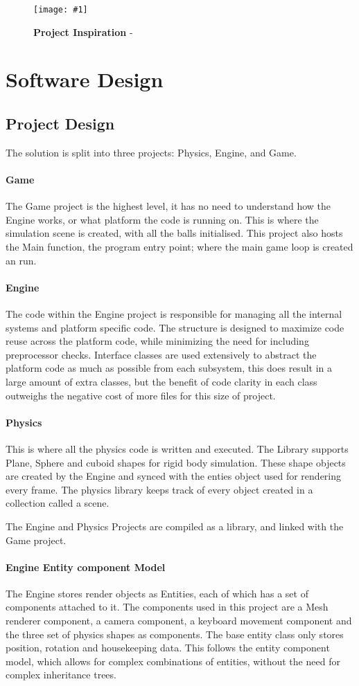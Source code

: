 \documentclass[conference]{acmsiggraph}
\newcommand{\figuremacroW}[4]{
	\begin{figure}[h] %
		\centering
		\texttt{[image: \#1]}
		\caption[#2]{\textbf{#2} - #3}
		\label{fig:#1}
	\end{figure}
}
\begin{document}
\figuremacroW
{balls2}
{Project Inspiration}
{\protect\cite{advert}}
{0.96}

\section{Software Design}
\subsection{Project Design}
The solution is split into three projects: Physics, Engine, and Game.
\paragraph{Game}
The Game project is the highest level, it has no need to understand how the Engine works, or what platform the code is running on. This is where the simulation scene is created, with all the balls initialised. This project also hosts the Main function, the program entry point; where the main game loop is created an run.

\paragraph{Engine}
The code within the Engine project is responsible for managing all the internal systems and platform specific code. The structure is designed to maximize code reuse across the platform code, while minimizing the need for including preprocessor checks. Interface classes are used extensively to abstract the platform code as much as possible from each subsystem, this does result in a large amount of extra classes, but the benefit of code clarity in each class outweighs the negative cost of more files for this size of project.

\paragraph{Physics}
This is where all the physics code is written and executed. The Library supports Plane, Sphere and cuboid shapes for rigid body simulation. These shape objects are created by the Engine and synced with the enties object used for rendering every frame. The physics library keeps track of every object created in a collection called a scene.

The Engine and Physics Projects are compiled as a library, and linked with the Game project.

\paragraph{Engine Entity component Model}
The Engine stores render objects as Entities, each of which has a set of components attached to it.
The components used in this project are a Mesh renderer component, a camera component, a keyboard movement component and the three set of physics shapes as components. The base entity class only stores  position, rotation and housekeeping data.
This follows the entity component model, which allows for complex combinations of entities, without the need for complex inheritance trees.
\end{document}
